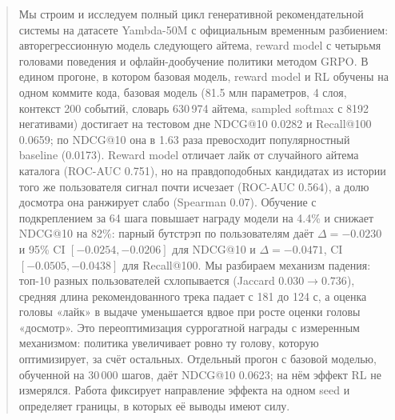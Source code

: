 \begin{abstract}
\noindent
Мы строим и исследуем полный цикл генеративной рекомендательной системы на
датасете Yambda-50M с официальным временным разбиением: авторегрессионную
модель следующего айтема, reward model с четырьмя головами поведения и
офлайн-дообучение политики методом GRPO. В едином прогоне, в котором базовая
модель, reward model и RL обучены на одном коммите кода, базовая модель
(81.5 млн параметров, 4 слоя, контекст 200 событий, словарь 630\,974 айтема,
sampled softmax с 8192 негативами) достигает на тестовом дне NDCG@10 0.0282
и Recall@100 0.0659; по NDCG@10 она в 1.63 раза превосходит популярностный
baseline (0.0173). Reward model отличает лайк от случайного айтема каталога
(ROC-AUC 0.751), но на правдоподобных кандидатах из истории того же
пользователя сигнал почти исчезает (ROC-AUC 0.564), а долю досмотра она
ранжирует слабо (Spearman 0.07). Обучение с подкреплением за 64 шага
повышает награду модели на 4.4\% и снижает NDCG@10 на 82\%: парный бутстрэп
по пользователям даёт $\Delta = -0.0230$ и 95\% CI $[-0.0254, -0.0206]$
для NDCG@10 и $\Delta = -0.0471$, CI $[-0.0505, -0.0438]$ для Recall@100.
Мы разбираем механизм падения: топ-10 разных пользователей схлопывается
(Jaccard $0.030 \to 0.736$), средняя длина рекомендованного трека падает с
181 до 124 с, а оценка головы «лайк» в выдаче уменьшается вдвое при росте
оценки головы «досмотр». Это переоптимизация суррогатной награды с измеренным
механизмом: политика увеличивает ровно ту голову, которую оптимизирует, за
счёт остальных. Отдельный прогон с базовой моделью, обученной на 30\,000
шагов, даёт NDCG@10 0.0623; на нём эффект RL не измерялся. Работа фиксирует
направление эффекта на одном seed и определяет границы, в которых её выводы
имеют силу.
\end{abstract}
